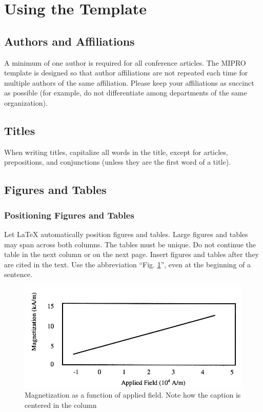 \documentclass{MIPRO}
\begin{document}
\section{Using the Template}

\subsection{Authors and Affiliations}

A minimum of one author is required for all conference articles. The MIPRO template is designed so that author affiliations are not repeated each time for multiple authors of the same affiliation. Please keep your affiliations as succinct as possible (for example, do not differentiate among departments of the same organization). 

\subsection{Titles}

When writing titles, capitalize all words in the title, except for articles, prepositions, and conjunctions (unless they are the first word of a title).

\subsection{Figures and Tables}

\subsubsection{Positioning Figures and Tables}

Let \LaTeX{} automatically position figures and tables. Large figures and tables may span across both columns. The tables must be unique. Do not continue the table in the next column or on the next page. Insert figures and tables after they are cited in the text. Use the abbreviation “Fig. \ref{fig:figure1}”, even at the beginning of a sentence.

\begin{figure}
  \centering
  \includegraphics{figure1.jpg}
  \caption{Magnetization as a function of applied field. Note how the caption is centered in the column}
  \label{fig:figure1}
\end{figure}
\end{document}
